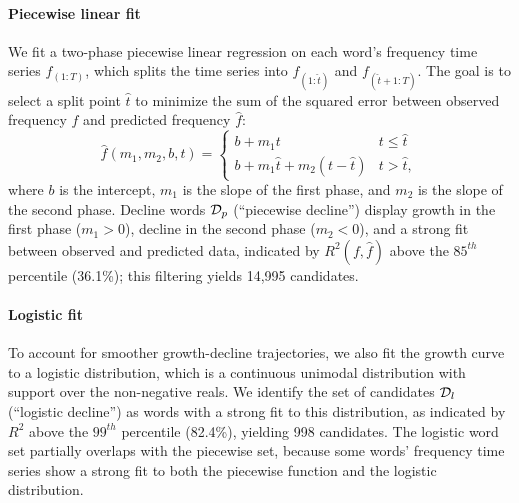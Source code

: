 \paragraph{Piecewise linear fit}
We fit a two-phase piecewise linear regression on each word's frequency time series $f_{(1:T)}$, which splits the time series into $f_{(1:\hat{t})}$ and $f_{(\hat{t}+1:T)}$.
The goal is to select a split point $\hat{t}$ to minimize the sum of the squared error between observed frequency $f$ and predicted frequency $\hat{f}$:
\begin{equation}
\hat{f}(m_{1}, m_{2}, b,  t) = 
\begin{cases}
b + m_{1}t & t \leq \hat{t} \\
b + m_1 \hat{t} + m_{2}(t - \hat{t}) & t > \hat{t},
\end{cases}
\end{equation}
where $b$ is the intercept, $m_{1}$ is the slope of the first phase, and $m_{2}$ is the slope of the second phase.
Decline words $\mathcal{D}_{p}$ (``piecewise decline'') display growth in the first phase ($m_{1} > 0$), decline in the second phase ($m_{2} < 0$), and a strong fit between observed and predicted data, indicated by $R^{2}(f, \hat{f})$ above the $85^{th}$ percentile (36.1\%); this filtering yields 14,995 candidates.

\paragraph{Logistic fit}
To account for smoother growth-decline trajectories, we also fit the growth curve to a logistic distribution, %
which is a continuous unimodal distribution with support over the non-negative reals. 
We identify the set of candidates $\mathcal{D}_{l}$ (``logistic decline'') as words with a strong fit to this distribution, as indicated by $R^{2}$ above the $99^{th}$ percentile (82.4\%), yielding 998 candidates. 
The logistic word set partially overlaps with the piecewise set, because some words' frequency time series show a strong fit to both the piecewise function and the logistic distribution.

